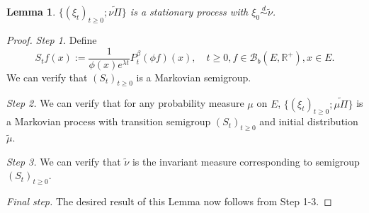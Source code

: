 \documentclass[12pt,a4paper]{amsart}
\numberwithin{equation}{section}
\theoremstyle{plain}
\newtheorem{lem}[thm]{Lemma}
\theoremstyle{definition}
\theoremstyle{remark}
\begin{document}
\begin{lem} \label{thm:E.15}
	$\{(\xi_t)_{t\geq 0}; \widetilde{\nu \Pi}\}$ is a stationary process with $\xi_0 \overset{d}\sim \widetilde \nu$.
\end{lem}
\begin{proof}
\emph{Step 1.} 
Define 
\[
	S_t f(x):= \frac{1}{\phi(x)e^{\lambda t}}P_t^\beta (\phi f) (x), \quad t\geq 0, f\in \mathcal B_b(E,\mathbb R^+),x\in E.
\]
We can verify that $(S_t)_{t\geq 0}$ is a Markovian semigroup.

\emph{Step 2.} 
We can verify that for any probability measure $\mu$ on $E$, $\{(\xi_t)_{t\geq 0}; \widetilde{\mu \Pi}\}$ is a Markovian process with transition semigroup $(S_t)_{t\geq 0}$ and initial distribution $\widetilde \mu$.

\emph{Step 3.}
We can verify that $\widetilde \nu$ is the invariant measure corresponding to semigroup $(S_t)_{t\geq 0}$.

\emph{Final step.} 
The desired result of this Lemma now follows from Step 1-3.
\end{proof}
\end{document}
